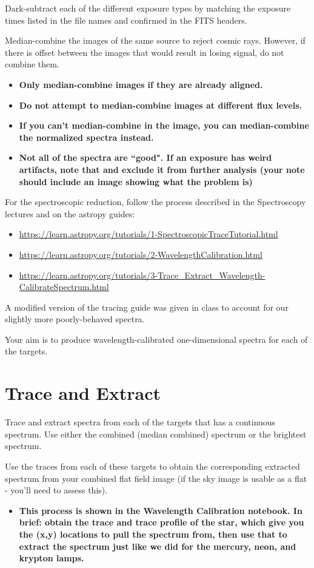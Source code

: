 \documentclass[11pt]{article}
\begin{document}
Dark-subtract each of the different exposure types by matching the exposure times listed in the file names and confirmed in the FITS headers.

Median-combine the images of the same source to reject cosmic rays.  However, if there is offset between the images that would result in losing signal, do not combine them.
\begin{itemize}
    \item \textbf{Only median-combine images if they are already aligned.}
    \item \textbf{Do not attempt to median-combine images at different flux levels.}
    \item \textbf{If you can't median-combine in the image, you can median-combine the normalized spectra instead.}
    \item \textbf{Not all of the spectra are ``good".  If an exposure has weird artifacts, note that and exclude it from further analysis (your note should include an image showing what the problem is)}
\end{itemize}

For the spectroscopic reduction, follow the process described in the
Spectroscopy lectures and on the astropy guides:

\begin{itemize}
    \item \url{https://learn.astropy.org/tutorials/1-SpectroscopicTraceTutorial.html}
    \item \url{https://learn.astropy.org/tutorials/2-WavelengthCalibration.html}
    \item \url{https://learn.astropy.org/tutorials/3-Trace_Extract_Wavelength-CalibrateSpectrum.html}
\end{itemize}

A modified version of the tracing guide was given in class to account for our
slightly more poorly-behaved spectra.

Your aim is to produce wavelength-calibrated one-dimensional spectra for each of the targets.



\section{Trace and Extract}
Trace and extract spectra from each of the targets that has a continuous spectrum.
Use either the combined (median combined) spectrum or the brightest spectrum.

Use the traces from each of these targets to obtain the corresponding extracted spectrum from your combined flat field image (if the sky image is usable as a flat - you'll need to assess this).
\begin{itemize}
    \item \textbf{This process is shown in the Wavelength Calibration notebook.  In brief: obtain the trace and trace profile of the star,
         which give you the (x,y) locations to pull the spectrum from, then use that to extract the spectrum just like we did for the mercury,
         neon, and krypton lamps.}
\end{itemize}
\end{document}
